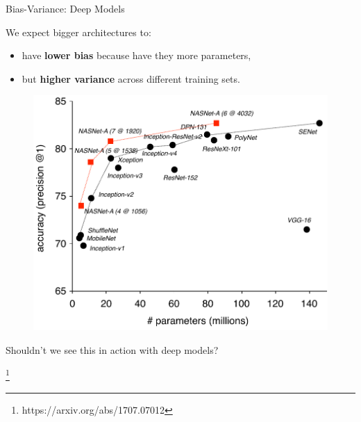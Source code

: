 \documentclass[notheorems]{beamer}
\newcommand{\source}[1]{{\let\thefootnote\relax\footnote{{\tiny #1}}}}
\begin{document}
    \begin{frame}{Bias-Variance: Deep Models}

        We expect bigger architectures to:
        \begin{itemize}
            \item have \textbf{lower bias} because have they more parameters,
            \item but \textbf{higher variance} across different training sets.
        \end{itemize}
        \vspace{0.1cm}
        \begin{minipage}[c]{0.68\textwidth}
            \begin{figure}
                \includegraphics[width=\textwidth]{figures/Params-Diagram-SE}%
            \end{figure}
        \end{minipage}%
        \hfill%
        \begin{minipage}[c]{0.28\textwidth}
            \centering
            \Large Shouldn't we see this in action with deep models?
        \end{minipage}
        \source{https://arxiv.org/abs/1707.07012}
    \end{frame}
\end{document}
